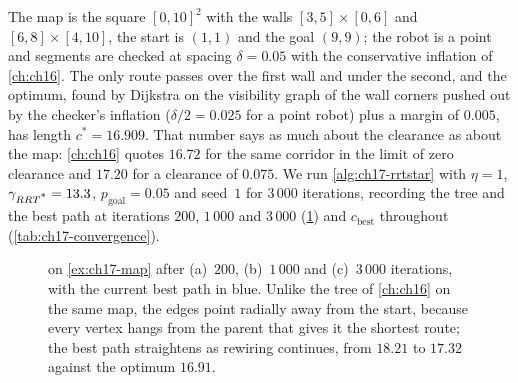\begin{example}
\label{ex:ch17-map}
The map is the square $[0,10]^2$ with the walls $[3,5]\times[0,6]$ and
$[6,8]\times[4,10]$, the start is $(1,1)$ and the goal $(9,9)$; the robot is
a point and segments are checked at spacing $\delta=0.05$ with the
conservative inflation of \cref{ch:ch16}. The only route passes over the
first wall and under the second, and the optimum, found by Dijkstra on the
visibility graph of the wall corners pushed out by the checker's inflation
($\delta/2=0.025$ for a point robot) plus a margin of $0.005$, has length
$c^*=16.909$. That number says as much about the clearance as about the
map: \cref{ch:ch16} quotes $16.72$ for the same corridor in the
limit of zero clearance and $17.20$ for a clearance of $0.075$. We run \cref{alg:ch17-rrtstar} with
$\eta=1$, $\gamma_{RRT\textsuperscript{*}}=13.3$, $p_{\mathrm{goal}}=0.05$ and seed~$1$ for
$3\,000$ iterations, recording the tree and the best path at iterations
$200$, $1\,000$ and $3\,000$ (\cref{fig:ch17-snapshots}) and
$c_{\mathrm{best}}$ throughout (\cref{tab:ch17-convergence}).
\end{example}

\begin{figure}[tb]
  \centering
  \caption{\rrtstar on \cref{ex:ch17-map} after (a)~$200$, (b)~$1\,000$ and
  (c)~$3\,000$ iterations, with the current best path in blue. Unlike the \rrt tree of \cref{ch:ch16}
  on the same map, the edges point radially away from the start, because
  every vertex hangs from the parent that gives it the shortest route; the
  best path straightens as rewiring continues, from $18.21$ to $17.32$
  against the optimum $16.91$.}
  \label{fig:ch17-snapshots}
\end{figure}

